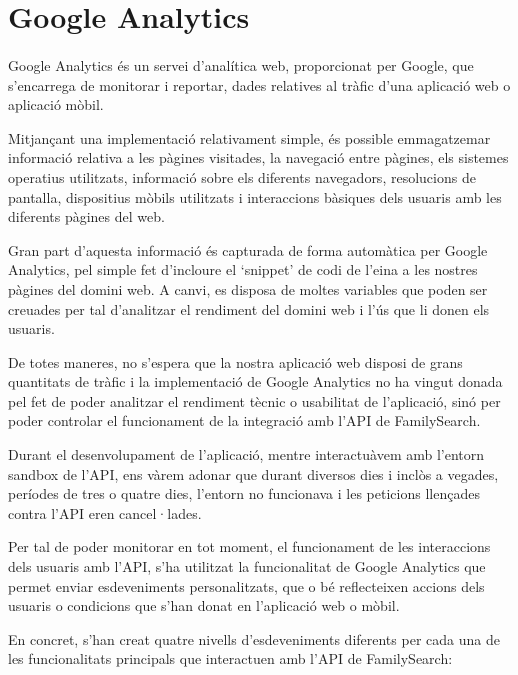 \section{Google Analytics}

    \paragraph{}
    Google Analytics és un servei d'analítica web, proporcionat per Google, que s'en\-ca\-rre\-ga de monitorar i reportar, dades relatives al tràfic d'una aplicació web o aplicació mòbil.

    Mitjançant una implementació relativament simple, és possible emmagatzemar informació relativa a les pàgines visitades, la navegació entre pàgines, els sistemes ope\-ra\-tius utilitzats, informació sobre els diferents navegadors, resolucions de pantalla, dispositius mòbils utilitzats i interaccions bàsiques dels usuaris amb les diferents pàgines del web.

    Gran part d'aquesta informació és capturada de forma automàtica per Google Analytics, pel simple fet d'incloure el `snippet' de codi de l'eina a les nostres pàgines del domini web. A canvi, es disposa de moltes variables que poden ser creuades per tal d'analitzar el rendiment del domini web i l'ús que li donen els usuaris.

    De totes maneres, no s'espera que la nostra aplicació web disposi de grans quantitats de tràfic i la implementació de Google Analytics no ha vingut donada pel fet de poder analitzar el rendiment tècnic o usabilitat de l'aplicació, sinó per poder controlar el funcionament de la integració amb l'API de FamilySearch.

    Durant el desenvolupament de l'aplicació, mentre interactuàvem amb l'entorn sandbox de l'API, ens vàrem adonar que durant diversos dies i inclòs a vegades, períodes de tres o quatre dies, l'entorn no funcionava i les peticions llençades contra l'API eren cancel·lades.

    Per tal de poder monitorar en tot moment, el funcionament de les interaccions dels usuaris amb l'API, s'ha utilitzat la funcionalitat de Google Analytics que permet enviar esdeveniments personalitzats, que o bé reflecteixen accions dels usuaris o condicions que s'han donat en l'aplicació web o mòbil.

    En concret, s'han creat quatre nivells d'esdeveniments diferents per cada una de les funcionalitats principals que interactuen amb l'API de FamilySearch:

